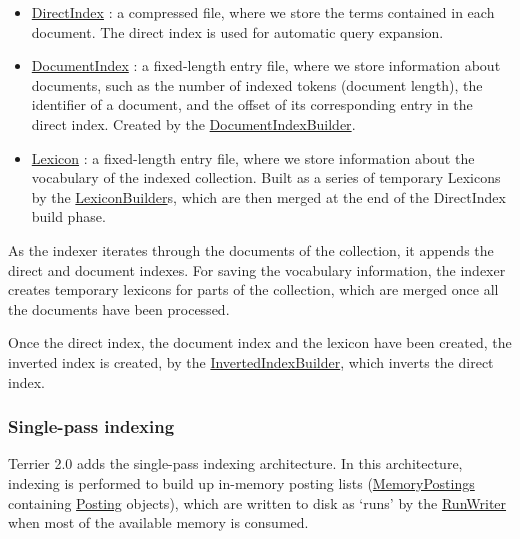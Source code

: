 \begin{itemize}
\tightlist
\item
  \href{javadoc/org/terrier/structures/bit/DirectIndex.html}{DirectIndex}
  : a compressed file, where we store the terms contained in each
  document. The direct index is used for automatic query expansion.
\item
  \href{javadoc/org/terrier/structures/DocumentIndex.html}{DocumentIndex}
  : a fixed-length entry file, where we store information about
  documents, such as the number of indexed tokens (document length), the
  identifier of a document, and the offset of its corresponding entry in
  the direct index. Created by the
  \href{javadoc/org/terrier/structures/indexing/DocumentIndexBuilder.html}{DocumentIndexBuilder}.
\item
  \href{javadoc/org/terrier/structures/Lexicon.html}{Lexicon} : a
  fixed-length entry file, where we store information about the
  vocabulary of the indexed collection. Built as a series of temporary
  Lexicons by the
  \href{javadoc/org/terrier/structures/indexing/LexiconBuilder.html}{LexiconBuilder}s,
  which are then merged at the end of the DirectIndex build phase.
\end{itemize}

As the indexer iterates through the documents of the collection, it
appends the direct and document indexes. For saving the vocabulary
information, the indexer creates temporary lexicons for parts of the
collection, which are merged once all the documents have been processed.

Once the direct index, the document index and the lexicon have been
created, the inverted index is created, by the
\href{javadoc/org/terrier/structures/indexing/classical/InvertedIndexBuilder.html}{InvertedIndexBuilder},
which inverts the direct index.

\subsubsection{Single-pass indexing}\label{single-pass-indexing}

Terrier 2.0 adds the single-pass indexing architecture. In this
architecture, indexing is performed to build up in-memory posting lists
(\href{javadoc/org/terrier/structures/indexing/singlepass/MemoryPostings.html}{MemoryPostings}
containing
\href{javadoc/org/terrier/structures/indexing/singlepass/Posting.html}{Posting}
objects), which are written to disk as `runs' by the
\href{javadoc/org/terrier/structures/indexing/singlepass/RunWriter.html}{RunWriter}
when most of the available memory is consumed.

